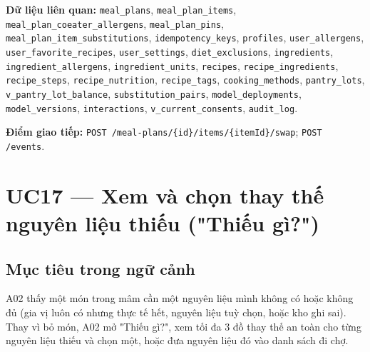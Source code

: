 \textbf{Dữ liệu liên quan:} {\small\texttt{meal\_\allowbreak{}\allowbreak{}plans}}, {\small\texttt{meal\_\allowbreak{}\allowbreak{}plan\_\allowbreak{}\allowbreak{}items}}, {\small\texttt{meal\_\allowbreak{}\allowbreak{}plan\_\allowbreak{}\allowbreak{}coeater\_\allowbreak{}\allowbreak{}allergens}}, {\small\texttt{meal\_\allowbreak{}\allowbreak{}plan\_\allowbreak{}\allowbreak{}pins}}, {\small\texttt{meal\_\allowbreak{}\allowbreak{}plan\_\allowbreak{}\allowbreak{}item\_\allowbreak{}\allowbreak{}substitutions}}, {\small\texttt{idempotency\_\allowbreak{}\allowbreak{}keys}}, {\small\texttt{profiles}}, {\small\texttt{user\_\allowbreak{}\allowbreak{}allergens}}, {\small\texttt{user\_\allowbreak{}\allowbreak{}favorite\_\allowbreak{}\allowbreak{}recipes}}, {\small\texttt{user\_\allowbreak{}\allowbreak{}settings}}, {\small\texttt{diet\_\allowbreak{}\allowbreak{}exclusions}}, {\small\texttt{ingredients}}, {\small\texttt{ingredient\_\allowbreak{}\allowbreak{}allergens}}, {\small\texttt{ingredient\_\allowbreak{}\allowbreak{}units}}, {\small\texttt{recipes}}, {\small\texttt{recipe\_\allowbreak{}\allowbreak{}ingredients}}, {\small\texttt{recipe\_\allowbreak{}\allowbreak{}steps}}, {\small\texttt{recipe\_\allowbreak{}\allowbreak{}nutrition}}, {\small\texttt{recipe\_\allowbreak{}\allowbreak{}tags}}, {\small\texttt{cooking\_\allowbreak{}\allowbreak{}methods}}, {\small\texttt{pantry\_\allowbreak{}\allowbreak{}lots}}, {\small\texttt{v\_\allowbreak{}\allowbreak{}pantry\_\allowbreak{}\allowbreak{}lot\_\allowbreak{}\allowbreak{}balance}}, {\small\texttt{substitution\_\allowbreak{}\allowbreak{}pairs}}, {\small\texttt{model\_\allowbreak{}\allowbreak{}deployments}}, {\small\texttt{model\_\allowbreak{}\allowbreak{}versions}}, {\small\texttt{interactions}}, {\small\texttt{v\_\allowbreak{}\allowbreak{}current\_\allowbreak{}\allowbreak{}consents}}, {\small\texttt{audit\_\allowbreak{}\allowbreak{}log}}.

\textbf{Điểm giao tiếp:} {\small\texttt{POST /\allowbreak{}\allowbreak{}meal-\allowbreak{}plans/\allowbreak{}\allowbreak{}\{id\}/\allowbreak{}\allowbreak{}items/\allowbreak{}\allowbreak{}\{itemId\}/\allowbreak{}\allowbreak{}swap}}; {\small\texttt{POST /\allowbreak{}\allowbreak{}events}}.

\section{UC17 --- Xem và chọn thay thế nguyên liệu thiếu ("Thiếu gì?")}
\subsection{Mục tiêu trong ngữ cảnh}
A02 thấy một món trong mâm cần một nguyên liệu mình không có hoặc không đủ (gia vị luôn có nhưng thực tế hết, nguyên liệu tuỳ chọn, hoặc kho ghi sai). Thay vì bỏ món, A02 mở "Thiếu gì?", xem tối đa 3 đồ thay thế an toàn cho từng nguyên liệu thiếu và chọn một, hoặc đưa nguyên liệu đó vào danh sách đi chợ.

